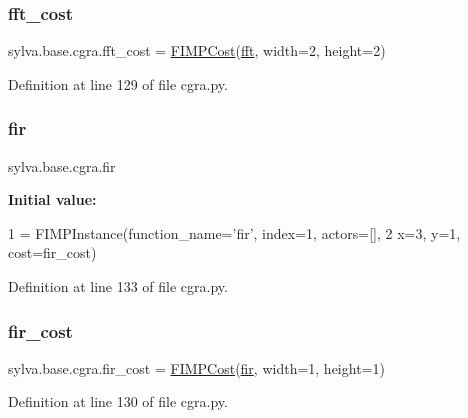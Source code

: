 \subsubsection{\texorpdfstring{fft\+\_\+cost}{fft\_cost}}
{\footnotesize\ttfamily sylva.\+base.\+cgra.\+fft\+\_\+cost = \hyperlink{classsylva_1_1base_1_1fimp_1_1_f_i_m_p_cost}{F\+I\+M\+P\+Cost}(\textquotesingle{}\hyperlink{namespacesylva_1_1base_1_1cgra_abc1c6fdee4ec52dc2897a70f342d3df9}{fft}\textquotesingle{}, width=2, height=2)}



Definition at line 129 of file cgra.\+py.

\mbox{\label{namespacesylva_1_1base_1_1cgra_a6cedc9184872b357ffe3ab9dc7abf09e}} 
\subsubsection{\texorpdfstring{fir}{fir}}
{\footnotesize\ttfamily sylva.\+base.\+cgra.\+fir}

{\bfseries Initial value\+:}
\begin{DoxyCode}
1 =  FIMPInstance(function\_name=\textcolor{stringliteral}{'fir'}, index=1, actors=[],
2                    x=3, y=1, cost=fir\_cost)
\end{DoxyCode}


Definition at line 133 of file cgra.\+py.

\mbox{\label{namespacesylva_1_1base_1_1cgra_a5da4792f8f8f7c77821e5ca332f02c21}} 
\subsubsection{\texorpdfstring{fir\+\_\+cost}{fir\_cost}}
{\footnotesize\ttfamily sylva.\+base.\+cgra.\+fir\+\_\+cost = \hyperlink{classsylva_1_1base_1_1fimp_1_1_f_i_m_p_cost}{F\+I\+M\+P\+Cost}(\textquotesingle{}\hyperlink{namespacesylva_1_1base_1_1cgra_a6cedc9184872b357ffe3ab9dc7abf09e}{fir}\textquotesingle{}, width=1, height=1)}



Definition at line 130 of file cgra.\+py.


